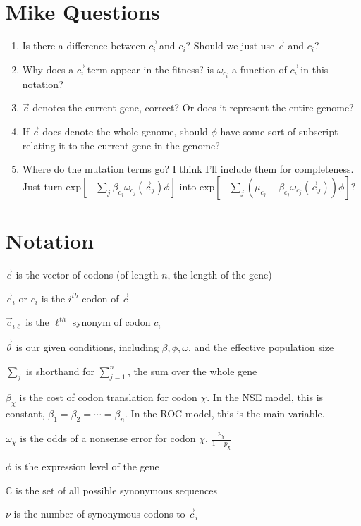 \documentclass[11pt]{article} %
\begin{document}
\section{Mike Questions}
\begin{enumerate}
\item Is there a difference between $\vec{c_i}$ and $c_i$? Should we just use $\vec{c}$ and $c_i$?
\item Why does a $\vec{c_i}$ term appear in the fitness? is $\omega_{c_i}$ a function of $\vec{c_i}$ in this notation?
\item $\vec{c}$ denotes the current gene, correct? Or does it represent the entire genome?
\item If $\vec{c}$ does denote the whole genome, should $\phi$ have some sort of subscript relating it to the current gene in the genome?
\item Where do the mutation terms go? I think I'll include them for completeness. Just turn
$\mbox{exp}\left[-\sum_{j} \beta_{c_j} \omega_{c_j} (\vec{c}_j) \phi \right]$
into
$\mbox{exp}\left[-\sum_{j} (\mu_{c_j} - \beta_{c_j} \omega_{c_j} (\vec{c}_j)) \phi \right]$?
\end{enumerate}


\section{Notation}

$\vec{c}$ is the vector of codons (of length $n$, the length of the gene)

$\vec{c}_i$ or $c_i$ is the $i^{th}$ codon of $\vec{c}$

$\vec{c}_{i\ell}$ is the $\ell^{th}$ synonym of codon $c_i$

$\vec{\theta}$ is our given conditions, including $\beta, \phi, \omega$, and the effective population size

$\sum_j$ is shorthand for $\sum_{j=1}^n$, the sum over the whole gene

$\beta_\chi$ is the cost of codon translation for codon $\chi$. In the NSE model, this is constant, $\beta_1 = \beta_2 = \cdots = \beta_n$. In the ROC model, this is the main variable.

$\omega_\chi$ is the odds of a nonsense error for codon $\chi$, $\frac{p_\chi}{1-p_\chi}$ 

$\phi$ is the expression level of the gene

$\mathbb{C}$ is the set of all possible synonymous sequences

$\nu$ is the number of synonymous codons to $\vec{c}_i$
\end{document}
